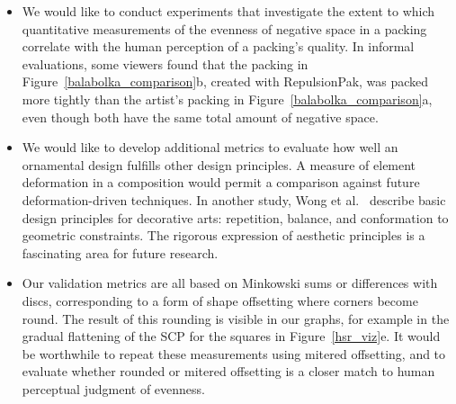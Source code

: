 \begin{itemize}

\item {} We would like to conduct experiments that investigate the
  extent to which quantitative measurements of the evenness of negative
  space in a packing correlate with the human perception of a
  packing's quality.  In informal evaluations, some viewers found that
  the packing in Figure~\ref{balabolka_comparison}b, created with RepulsionPak,
  was packed more tightly than the artist's packing in
  Figure~\ref{balabolka_comparison}a, even though both have the same total
  amount of negative space.


\item {} We would like to develop additional metrics to evaluate
  how well an ornamental design fulfills other design principles.
  A measure of element deformation in a composition would permit 
  a comparison against future deformation-driven techniques.
  In another study, Wong et al.~\cite{Wong1998} describe basic design
  principles for decorative arts: repetition, balance, and conformation
  to geometric constraints.  The rigorous expression of aesthetic principles
  is a fascinating area for future research.

\item {}
Our validation metrics are all based on Minkowski sums or
  differences with discs, corresponding to a form of shape offsetting
  where corners become round.  The result of this rounding is visible in
  our graphs, for example in the gradual flattening of the SCP for
  the squares in Figure~\ref{hsr_viz}e.  It would be worthwhile to repeat
  these measurements using mitered offsetting, and to evaluate whether
  rounded or mitered offsetting is a closer match to human perceptual
  judgment of evenness.


\end{itemize}

